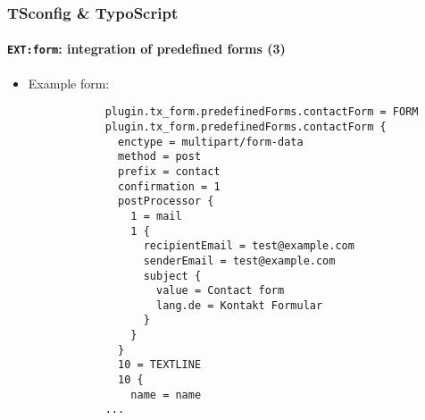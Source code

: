 \begin{frame}[fragile]
	\frametitle{TSconfig \& TypoScript}
	\framesubtitle{\texttt{EXT:form}: integration of predefined forms (3)}

	\lstset{basicstyle=\tiny\ttfamily}

	\begin{itemize}

		\item Example form:

		\begin{lstlisting}
			plugin.tx_form.predefinedForms.contactForm = FORM
			plugin.tx_form.predefinedForms.contactForm {
			  enctype = multipart/form-data
			  method = post
			  prefix = contact
			  confirmation = 1
			  postProcessor {
			    1 = mail
			    1 {
			      recipientEmail = test@example.com
			      senderEmail = test@example.com
			      subject {
			        value = Contact form
			        lang.de = Kontakt Formular
			      }
			    }
			  }
			  10 = TEXTLINE
			  10 {
			    name = name
			...
		\end{lstlisting}

	\end{itemize}

\end{frame}

